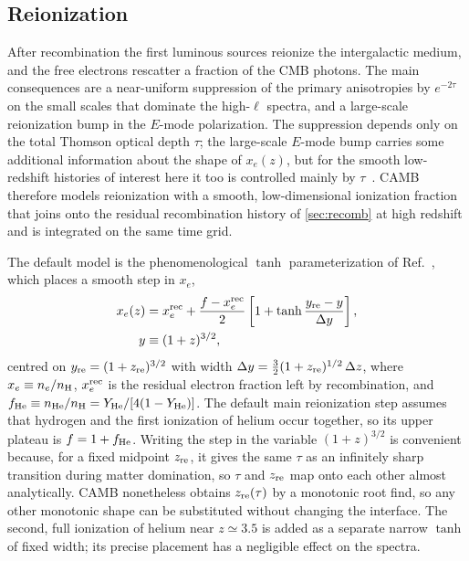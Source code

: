 \documentclass[prd, twocolumn, superscriptaddress, tightenlines, longbibliography, nofootinbib, eqsecnum, amsfonts, amsmath, floatfix, notitlepage]{revtex4-2}
\begin{document}
\subsection{Reionization}
\label{sec:reion}

After recombination the first luminous sources reionize the intergalactic medium,
and the free electrons rescatter a fraction of the CMB photons. The main
consequences are a near-uniform suppression of the primary anisotropies by
$e^{-2\tau}$ on the small scales that dominate the high-$\ell$ spectra, and a
large-scale reionization bump in the $E$-mode polarization. The suppression
depends only on the total Thomson optical depth $\tau$; the large-scale $E$-mode
bump carries some additional information about the shape of $x_e(z)$, but for the
smooth low-redshift histories of interest here it too is controlled mainly by
$\tau$~\cite{Mortonson:2007hq}. \textsc{CAMB} therefore models reionization with a
smooth,
low-dimensional ionization fraction that joins onto the residual recombination
history of \cref{sec:recomb} at high redshift and is integrated on the same time
grid.

The default model is the phenomenological $\tanh$ parameterization of
Ref.~\cite{Lewis:2008wr}, which places a smooth step in $x_e$,
\begin{equation}
  \label{eq:reion-tanh}
  \begin{aligned}
  x_e(z)&=x_e^{\rm rec} + \frac{f - x_e^{\rm rec}}{2}
  \left[1 + \tanh\frac{y_{\rm re}-y}{\Delta y}\right],\\
  y&\equiv (1+z)^{3/2},
  \end{aligned}
\end{equation}
centred on $y_{\rm re}=(1+z_{\rm re})^{3/2}$ with width
$\Delta y = \tfrac{3}{2}(1+z_{\rm re})^{1/2}\,\Delta z$, where
$x_e\equiv n_e/n_{\rm H}$, $x_e^{\rm rec}$ is the residual electron fraction
left by recombination, and
$f_{\rm He}\equiv n_{\rm He}/n_{\rm H}=Y_{\rm He}/[4(1-Y_{\rm He})]$. The
default main reionization step assumes that hydrogen and the first ionization of
helium occur together, so its upper plateau is $f=1+f_{\rm He}$. Writing the
step in the variable $(1+z)^{3/2}$ is convenient because, for a fixed midpoint
$z_{\rm re}$, it gives the same $\tau$ as an infinitely sharp transition during
matter domination, so $\tau$ and $z_{\rm re}$ map onto each other almost
analytically. \textsc{CAMB} nonetheless obtains $z_{\rm re}(\tau)$ by a monotonic
root find, so any other monotonic shape can be substituted without changing the
interface. The second, full ionization of helium near $z\simeq3.5$ is added as a
separate narrow $\tanh$ of fixed width; its precise placement has a negligible
effect on the spectra.
\end{document}
